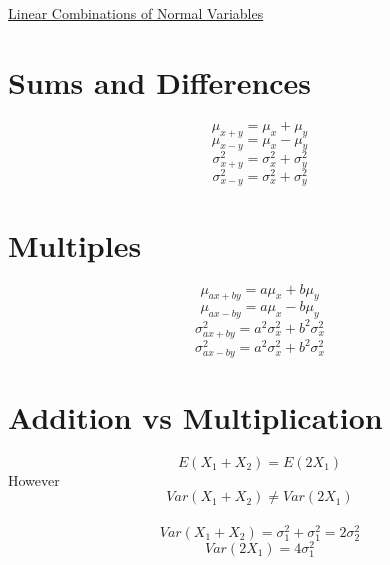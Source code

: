 \documentclass{article}[18pt]
\begin{document}
\begin{center}
\underline{\huge Linear Combinations of Normal Variables}
\end{center}
\large
\section{Sums and Differences}
$$\mu_{x+y}=\mu_x+\mu_y$$
$$\mu_{x-y}=\mu_x-\mu_y$$
$$\sigma^2_{x+y}=\sigma^2_x+\sigma^2_y$$
$$\sigma^2_{x-y}=\sigma^2_x+\sigma^2_y$$
\section{Multiples}
$$\mu_{ax+by}=a\mu_x+b\mu_y$$
$$\mu_{ax-by}=a\mu_x-b\mu_y$$
$$\sigma^2_{ax+by}=a^2\sigma^2_x+b^2\sigma^2_x$$
$$\sigma^2_{ax-by}=a^2\sigma^2_x+b^2\sigma^2_x$$
\section{Addition vs Multiplication}
$$E(X_1+X_2)=E(2X_1)$$
However
$$Var(X_1+X_2)\neq Var(2X_1)$$
\\
$$Var(X_1+X_2)=\sigma_1^2+\sigma_1^2=2\sigma_2^2$$
$$Var(2X_1)=4\sigma^2_1$$
\end{document}
